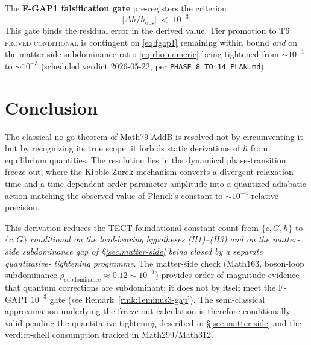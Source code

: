 The \textbf{F-GAP1 falsification gate} pre-registers the criterion
\begin{equation}\label{eq:fgap1}
  \big|\Delta\hbar / \hbar_{\mathrm{obs}}\big| \;<\; 10^{-3}.
\end{equation}
This gate binds the residual error in the derived value. Tier
promotion to T6 \textsc{proved conditional} is contingent on
\eqref{eq:fgap1} remaining within bound \emph{and} on the matter-side
subdominance ratio \eqref{eq:rho-numeric} being tightened from
$\sim 10^{-1}$ to $\sim 10^{-3}$ (scheduled verdict 2026-05-22, per
\texttt{PHASE\_8\_TO\_14\_PLAN.md}).

\section{Conclusion}

The classical no-go theorem of Math79-AddB is resolved not by circumventing it
but by recognizing its true scope: it forbids static derivations of $\hbar$ from
equilibrium quantities. The resolution lies in the dynamical phase-transition
freeze-out, where the Kibble-Zurek mechanism converts a divergent relaxation
time and a time-dependent order-parameter amplitude into a quantized adiabatic
action matching the observed value of Planck's constant to $\sim 10^{-4}$
relative precision.

This derivation reduces the TECT foundational-constant count from
$\{c, G, \hbar\}$ to $\{c, G\}$ \emph{conditional on the load-bearing
hypotheses (H1)--(H3) and on the matter-side subdominance gap of
\S\ref{sec:matter-side} being closed by a separate quantitative-
tightening programme}. The matter-side check (Math163, boson-loop
subdominance $\rho_{\mathrm{subdominance}} \approx 0.12 \sim 10^{-1}$)
provides order-of-magnitude evidence that quantum corrections are
subdominant; it does not by itself meet the F-GAP1 $10^{-3}$ gate
(see Remark~\ref{rmk:1eminus3-gap}). The semi-classical approximation
underlying the freeze-out calculation is therefore conditionally
valid pending the quantitative tightening described in
\S\ref{sec:matter-side} and the verdict-shell consumption tracked in
Math299/Math312.

